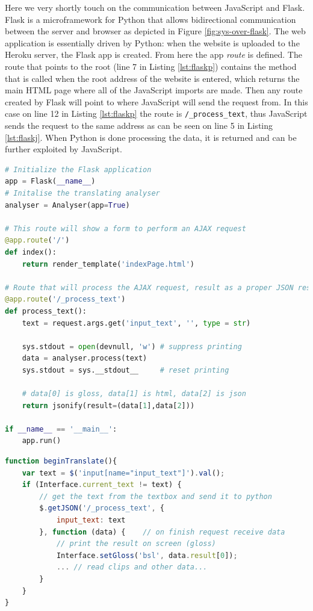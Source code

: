 \documentclass[12pt]{ociamthesis}  %
\begin{document}
Here we very shortly touch on the communication between JavaScript and Flask. Flask is a microframework for Python that allows bidirectional communication between the server and browser as depicted in Figure \ref{fig:sys-over-flask}. The web application is essentially driven by Python: when the website is uploaded to the Heroku server, the Flask app is created. From here the app \textit{route} is defined. The route that points to the root (line 7 in Listing \ref{lst:flaskp}) contains the method that is called when the root address of the website is entered, which returns the main HTML page where all of the JavaScript imports are made. Then any route created by Flask will point to where JavaScript will send the request from. In this case on line 12 in Listing \ref{lst:flaskp} the route is \texttt{/\_process\_text}, thus JavaScript sends the request to the same address as can be seen on line 5 in Listing \ref{lst:flaskj}. When Python is done processing the data, it is returned and can be further exploited by JavaScript.
\begin{lstlisting}[language=python,caption = {Python and JavaScript communication, Python code}, label = lst:flaskp]
# Initialize the Flask application
app = Flask(__name__)
# Initalise the translating analyser
analyser = Analyser(app=True)

# This route will show a form to perform an AJAX request
@app.route('/')
def index():
    return render_template('indexPage.html')

# Route that will process the AJAX request, result as a proper JSON response (Content-Type, etc.)
@app.route('/_process_text')
def process_text():
    text = request.args.get('input_text', '', type = str)

    sys.stdout = open(devnull, 'w') # suppress printing
    data = analyser.process(text)
    sys.stdout = sys.__stdout__     # reset printing

    # data[0] is gloss, data[1] is html, data[2] is json
    return jsonify(result=(data[1],data[2]))

if __name__ == '__main__':
	app.run()
\end{lstlisting}
\begin{lstlisting}[language=JavaScript,caption = {Python and JavaScript communication, JavaScript code}, label = lst:flaskj]
function beginTranslate(){
    var text = $('input[name="input_text"]').val();
    if (Interface.current_text != text) {
        // get the text from the textbox and send it to python
        $.getJSON('/_process_text', {
            input_text: text
        }, function (data) { 	// on finish request receive data
         	// print the result on screen (gloss)
            Interface.setGloss('bsl', data.result[0]);    
            ... // read clips and other data...
        }
    }
}
\end{lstlisting}
\end{document}
